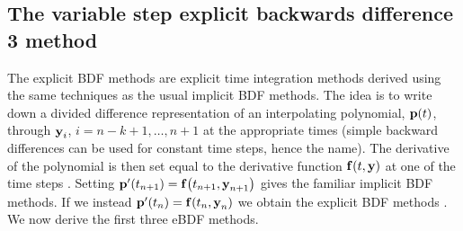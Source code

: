 \subsection{The variable step explicit backwards difference 3 method}

The explicit BDF methods are explicit time integration methods derived using the same techniques as the usual implicit BDF methods.
The idea is to write down a divided difference representation of an interpolating polynomial, ${\boldsymbol{\mathrm{p}}}(t)$, through $\boldsymbol{\mathrm{y}}_i$, $i=n-k+1, \ldots, n+1$ at the appropriate times (simple backward differences can be used for constant time steps, hence the name).
The derivative of the polynomial is then set equal to the derivative function ${\boldsymbol{\mathrm{f}}{\left( t, \boldsymbol{\mathrm{y}} \right)}}$ at one of the time steps \cite[400]{HairerNorsettWanner}.
Setting ${\boldsymbol{\mathrm{p}}}'(t_{n+1}) = {\boldsymbol{\mathrm{f}}{\left( t_{n+1}, \boldsymbol{\mathrm{y}}_{n+1} \right)}}$ gives the familiar implicit BDF methods.
If we instead ${\boldsymbol{\mathrm{p}}}'(t_{n}) = {\boldsymbol{\mathrm{f}}{\left( t_{n}, \boldsymbol{\mathrm{y}}_{n} \right)}}$ we obtain the explicit BDF methods \cite[364]{HairerNorsettWanner}.
We now derive the first three eBDF methods.

